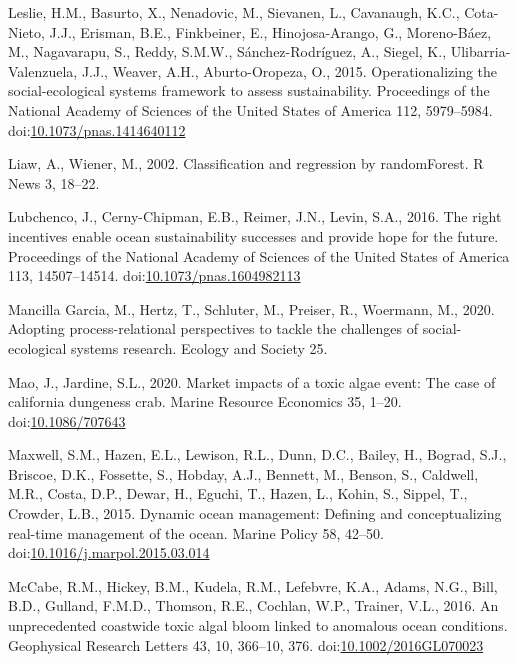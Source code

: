 \documentclass[]{elsarticle} %
\begin{document}
\leavevmode\hypertarget{ref-Leslie2015}{}%
Leslie, H.M., Basurto, X., Nenadovic, M., Sievanen, L., Cavanaugh, K.C.,
Cota-Nieto, J.J., Erisman, B.E., Finkbeiner, E., Hinojosa-Arango, G.,
Moreno-Báez, M., Nagavarapu, S., Reddy, S.M.W., Sánchez-Rodríguez, A.,
Siegel, K., Ulibarria-Valenzuela, J.J., Weaver, A.H., Aburto-Oropeza,
O., 2015. Operationalizing the social-ecological systems framework to
assess sustainability. Proceedings of the National Academy of Sciences
of the United States of America 112, 5979--5984.
doi:\href{https://doi.org/10.1073/pnas.1414640112}{10.1073/pnas.1414640112}

\leavevmode\hypertarget{ref-Wiener2003}{}%
Liaw, A., Wiener, M., 2002. Classification and regression by
randomForest. R News 3, 18--22.

\leavevmode\hypertarget{ref-Lubchenco2016}{}%
Lubchenco, J., Cerny-Chipman, E.B., Reimer, J.N., Levin, S.A., 2016. The
right incentives enable ocean sustainability successes and provide hope
for the future. Proceedings of the National Academy of Sciences of the
United States of America 113, 14507--14514.
doi:\href{https://doi.org/10.1073/pnas.1604982113}{10.1073/pnas.1604982113}

\leavevmode\hypertarget{ref-Mancilla2020}{}%
Mancilla Garcia, M., Hertz, T., Schluter, M., Preiser, R., Woermann, M.,
2020. Adopting process-relational perspectives to tackle the challenges
of social-ecological systems research. Ecology and Society 25.

\leavevmode\hypertarget{ref-Mao2020}{}%
Mao, J., Jardine, S.L., 2020. Market impacts of a toxic algae event: The
case of california dungeness crab. Marine Resource Economics 35, 1--20.
doi:\href{https://doi.org/10.1086/707643}{10.1086/707643}

\leavevmode\hypertarget{ref-Maxwell2015}{}%
Maxwell, S.M., Hazen, E.L., Lewison, R.L., Dunn, D.C., Bailey, H.,
Bograd, S.J., Briscoe, D.K., Fossette, S., Hobday, A.J., Bennett, M.,
Benson, S., Caldwell, M.R., Costa, D.P., Dewar, H., Eguchi, T., Hazen,
L., Kohin, S., Sippel, T., Crowder, L.B., 2015. Dynamic ocean
management: Defining and conceptualizing real-time management of the
ocean. Marine Policy 58, 42--50.
doi:\href{https://doi.org/10.1016/j.marpol.2015.03.014}{10.1016/j.marpol.2015.03.014}

\leavevmode\hypertarget{ref-McCabe2016}{}%
McCabe, R.M., Hickey, B.M., Kudela, R.M., Lefebvre, K.A., Adams, N.G.,
Bill, B.D., Gulland, F.M.D., Thomson, R.E., Cochlan, W.P., Trainer,
V.L., 2016. An unprecedented coastwide toxic algal bloom linked to
anomalous ocean conditions. Geophysical Research Letters 43, 10,
366--10, 376.
doi:\href{https://doi.org/10.1002/2016GL070023}{10.1002/2016GL070023}
\end{document}
